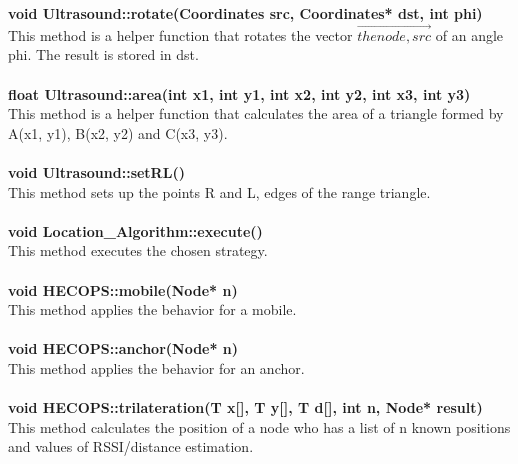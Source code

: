 \documentclass[a4paper,10pt]{article}
\begin{document}
\textbf{void Ultrasound::rotate(Coordinates src, Coordinates* dst, int phi)}\\
This method is a helper function that rotates the vector $\overrightarrow{the node, src}$ of an angle phi. The result is stored in dst.\\ \\
\textbf{float Ultrasound::area(int x1, int y1, int x2, int y2, int x3, int y3) }\\
This method is a helper function that calculates the area of a triangle formed by A(x1, y1), B(x2, y2) and C(x3, y3).\\ \\
\textbf{void Ultrasound::setRL() }\\
This method sets up the points R and L, edges of the range triangle.\\ \\
\textbf{void Location\_Algorithm::execute()} \\
This method executes the chosen strategy.\\ \\
\textbf{void HECOPS::mobile(Node* n)}\\
This method applies the behavior for a mobile.\\ \\
\textbf{void HECOPS::anchor(Node* n)}\\
This method applies the behavior for an anchor.\\ \\
\textbf{void HECOPS::trilateration(T x[], T y[], T d[], int n, Node* result)}\\
This method calculates the position of a node who has a list of n known positions and values of RSSI/distance estimation.
\end{document}
